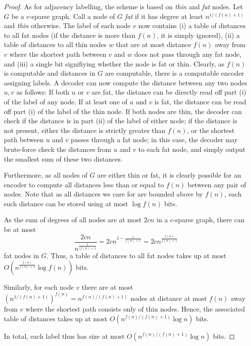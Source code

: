 \begin{proof}
As for adjacency labelling, the scheme is based on \emph{thin} and \emph{fat} nodes. Let $G$ be a $c$-sparse graph. Call
a node of $G$ \emph{fat} if it has degree at least $n^{1/(f(n)+1)}$ and \emph{thin} otherwise.
The label of each node $v$ now contains (i) a table of distances to all fat nodes (if the distance is more than $f(n)$, it is simply ignored), (ii) a table of distances to all thin nodes $w$ that are at most distance $f(n)$ away from $v$
where the shortest path between $v$ and $w$ does not pass through any fat node, and (iii) a single bit signifiying whether the node is fat or thin.
Clearly, as $f(n)$ is computable and distances in $G$ are computable, there is a computable encoder
assigning labels. A decoder can now compute the distance between any two nodes $u,v$ as follows:
If both $u$ or $v$ are fat, the distance can be directly read off part (i) of the label of any node. If at least one of $u$ 
and $v$ is fat, the distance can be read off part (i) of the label of the thin node. If both nodes are thin, the decoder
can check if the distance is in part (ii) of the label of either node; if the distance is not present, 
either the distance is strictly greater than $f(n)$, or the shortest path between $u$ and $v$ passes through
a fat node; in this case, the decoder may brute-force check the distances from $u$ and $v$ to each fat node,
and simply output the smallest sum of these two distances.

Furthermore, as all nodes of $G$ are either thin or fat, it is clearly possible for an encoder to compute
all distances less than or equal to $f(n)$ between any pair of nodes. Note that as all distances we care for 
are bounded above by $f(n)$, each such distance can be stored using at most $\log f(n)$ bits.

As the sum of degrees of all nodes are at most $2cn$ in a $c$-sparse graph, there can be at most
$$
\frac{2cn}{n^{\frac{1}{(f(n)+1}}} = 2cn^{1-\frac{1}{f(n)+1}} = 2cn^{\frac{f(n)}{f(n)+1}}
$$
fat nodes in $G$. Thus, a table of distances to all fat nodes takes up at most $O(n^{\frac{f(n)}{f(n)+1}} \log f(n))$ bits.

Similarly, for each node $v$ there are at most $(n^{1/(f(n)+1)})^{f(n)} = n^{f(n)/(f(n)+1)}$ nodes at distance at most $f(n)$ away from $v$ where the shortest path consists only of thin nodes. Hence, the associated table of distances
takes up at most $O(n^{f(n)/(f(n)+1)} \log n)$ bits.

In total, each label thus has size at most $O(n^{f(n)/(f(n)+1)} \log n)$ bits.
\end{proof}


